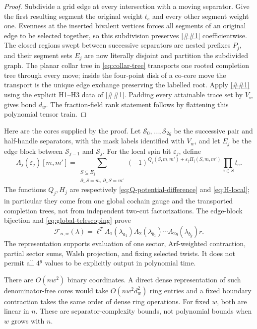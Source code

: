 \documentclass[11pt]{article}
\newcommand{\cref}[1]{\autoref{##1}}%
\newcommand{\cF}{\mathcal F}
\begin{document}
\begin{proof}
Subdivide a grid edge at every intersection with a moving separator.  Give
the first resulting segment the original weight \(t_e\) and every other
segment weight one.  Evenness at the inserted bivalent vertices forces all
segments of an original edge to be selected together, so this subdivision
preserves \cref{eq:F} coefficientwise.  The closed regions swept between
successive separators are nested prefixes \(P_j\), and their segment sets
\(E_j\) are now literally disjoint and partition the subdivided graph.  The
planar collar tree in \eqref{eq:collar-tree} transports one rooted completion
tree through every move; inside the four-point disk of a co-core move the
transport is the unique edge exchange preserving the labelled root.
Apply \cref{lem:phase-telescoping} using the explicit
H1--H3 data of \cref{lem:grid-exact}.  Padding every attainable trace set by
\(V_w\) gives bond \(d_w\).  The fraction-field rank statement follows by
flattening this polynomial tensor train.
\end{proof}

Here are the cores supplied by the proof.  Let
\(\mathcal S_0,\ldots,\mathcal S_{2g}\) be the successive pair and half-handle
separators, with the mask labels identified with \(V_w\), and let \(E_j\) be
the edge block between \(\mathcal S_{j-1}\) and \(\mathcal S_j\).  For the local
spin bit \(\varepsilon_j\), define
\begin{equation}\label{eq:cores}
 A_j(\varepsilon_j)[m,m']
 =\sum_{\substack{S\subseteq E_j\\
       \partial_-S=m,\ \partial_+S=m'}}
 (-1)^{Q_j(S,m,m')+\varepsilon_jH_j(S,m,m')}
 \prod_{e\in S}t_e .
\end{equation}
The functions \(Q_j,H_j\) are respectively
\eqref{eq:Q-potential-difference} and \eqref{eq:H-local}; in particular they
come from one global cochain gauge and the transported completion trees, not
from independent two-cut factorizations.  The edge-block bijection and
\eqref{eq:global-telescoping} prove
\begin{equation}\label{eq:allq-mps}
 \cF_{n,w}(\lambda)=
 \ell^TA_1(\lambda_{a_1})A_2(\lambda_{b_1})\cdots
 A_{2g}(\lambda_{b_g})r.
\end{equation}
The representation supports evaluation of one sector, Arf-weighted
contraction, partial sector sums, Walsh projection, and fixing selected
twists.  It does not permit all \(4^g\) values to be explicitly output in
polynomial time.

There are \(O(nw^2)\) binary coordinates.  A direct dense representation of
such denominator-free cores would take \(O(nw^2d_w^2)\) ring entries and a fixed boundary contraction
takes the same order of dense ring operations.  For fixed \(w\), both are
linear in \(n\).  These are separator-complexity bounds, not polynomial bounds
when \(w\) grows with \(n\).
\end{document}
